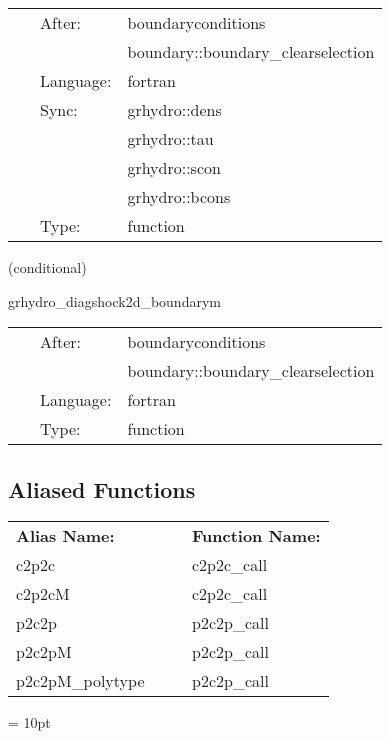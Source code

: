 \documentclass{article}
\begin{document}
\hspace{5mm}

 \begin{tabular*}{160mm}{cll} 
~ & After:  & boundaryconditions \\ 
~& ~ &boundary::boundary\_clearselection\\ 
~ & Language:  & fortran \\ 
~ & Sync:  & grhydro::dens \\ 
~& ~ &grhydro::tau\\ 
~& ~ &grhydro::scon\\ 
~& ~ &grhydro::bcons\\ 
~ & Type:  & function \\ 
\end{tabular*} 


\vspace{5mm}

   (conditional) 

\hspace{5mm} grhydro\_diagshock2d\_boundarym 

\hspace{5mm}{\it 2-d diagonal shock boundary conditions } 


\hspace{5mm}

 \begin{tabular*}{160mm}{cll} 
~ & After:  & boundaryconditions \\ 
~& ~ &boundary::boundary\_clearselection\\ 
~ & Language:  & fortran \\ 
~ & Type:  & function \\ 
\end{tabular*} 


\subsection*{Aliased Functions}

\hspace{5mm}

 \begin{tabular*}{160mm}{ll} 

{\bf Alias Name:} ~~~~~~~ & {\bf Function Name:} \\ 
c2p2c & c2p2c\_call \\ 
c2p2cM & c2p2c\_call \\ 
p2c2p & p2c2p\_call \\ 
p2c2pM & p2c2p\_call \\ 
p2c2pM\_polytype & p2c2p\_call \\ 
\end{tabular*} 



\vspace{5mm}\parskip = 10pt 
\end{document}
